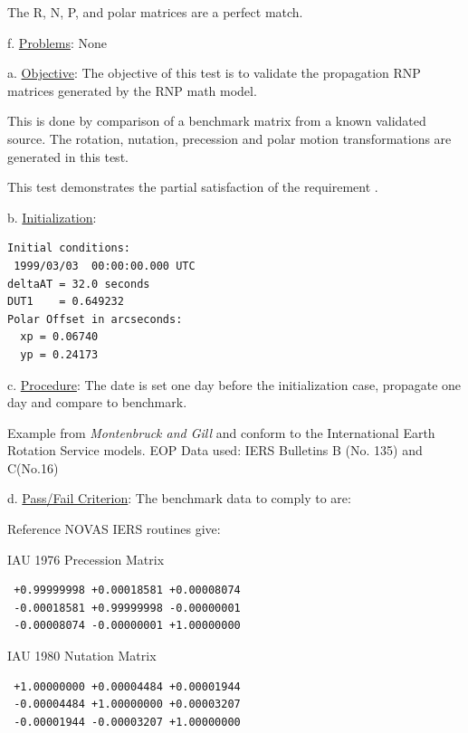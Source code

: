The R, N, P, and 
polar matrices are a perfect match.\newline

f. \underline{ Problems}:\newline
None



\label{test:rnp_test2}

a. \underline{Objective}:\newline
The objective of this test is to validate the propagation 
RNP matrices generated by the RNP math model.

This is done by comparison of a benchmark matrix from a 
known validated source.  The rotation, nutation, precession 
and polar motion transformations are generated in this test.

This test demonstrates the partial satisfaction
of the requirement .

b. \underline{Initialization}:
\begin{verbatim}
Initial conditions:
 1999/03/03  00:00:00.000 UTC
deltaAT = 32.0 seconds
DUT1    = 0.649232
Polar Offset in arcseconds:
  xp = 0.06740
  yp = 0.24173
\end{verbatim}

c. \underline{Procedure}:\newline
The date is set one day before the initialization case, 
propagate one day and compare to benchmark.

Example from {\em Montenbruck and Gill} \cite{MG} 
and conform to the International Earth Rotation Service models.  
EOP Data used: IERS Bulletins B (No. 135) and C(No.16)\newline

d. \underline{Pass/Fail Criterion}:\newline
The benchmark data to comply to are:

Reference NOVAS \cite{NOVAS} IERS routines give:

IAU 1976 Precession Matrix
\begin{verbatim}
 +0.99999998 +0.00018581 +0.00008074
 -0.00018581 +0.99999998 -0.00000001
 -0.00008074 -0.00000001 +1.00000000
\end{verbatim}

IAU 1980 Nutation Matrix
\begin{verbatim}
 +1.00000000 +0.00004484 +0.00001944
 -0.00004484 +1.00000000 +0.00003207
 -0.00001944 -0.00003207 +1.00000000
\end{verbatim}

